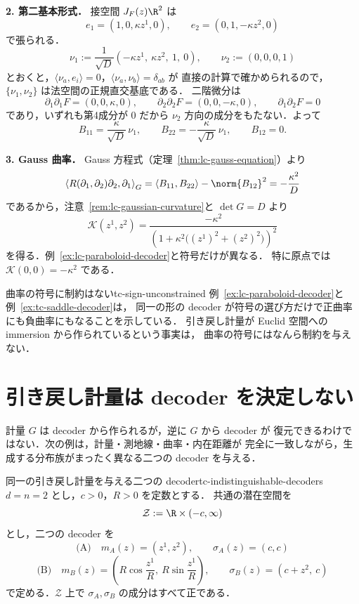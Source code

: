 \textbf{2. 第二基本形式．}
接空間 $J_F(z)\R^2$ は
\[
  e_1=(1,0,\kappa z^1,0),
  \qquad
  e_2=(0,1,-\kappa z^2,0)
\]
で張られる．
\[
  \nu_1:=\frac{1}{\sqrt{D}}\left(-\kappa z^1,\ \kappa z^2,\ 1,\ 0\right),
  \qquad
  \nu_2:=(0,0,0,1)
\]
とおくと，$\langle\nu_a,e_i\rangle=0$，$\langle\nu_a,\nu_b\rangle=\delta_{ab}$ が
直接の計算で確かめられるので，$\{\nu_1,\nu_2\}$ は法空間の正規直交基底である．
二階微分は
\[
  \partial_1\partial_1F=(0,0,\kappa,0),
  \qquad
  \partial_2\partial_2F=(0,0,-\kappa,0),
  \qquad
  \partial_1\partial_2F=0
\]
であり，いずれも第4成分が $0$ だから $\nu_2$ 方向の成分をもたない．よって
\[
  B_{11}=\frac{\kappa}{\sqrt D}\,\nu_1,
  \qquad
  B_{22}=-\frac{\kappa}{\sqrt D}\,\nu_1,
  \qquad
  B_{12}=0.
\]

\textbf{3. Gauss 曲率．}
Gauss 方程式（定理~\ref{thm:lc-gauss-equation}）より
\[
  \left\langle R(\partial_1,\partial_2)\partial_2,\partial_1\right\rangle_G
  =\langle B_{11},B_{22}\rangle-\norm{B_{12}}^2
  =-\frac{\kappa^2}{D}
\]
であるから，注意~\ref{rem:lc-gaussian-curvature}と $\det G=D$ より
\[
  \boxed{
    \mathcal{K}(z^1,z^2)
    =\frac{-\kappa^2}
      {\left(1+\kappa^2\bigl((z^1)^2+(z^2)^2\bigr)\right)^2}
  }
\]
を得る．例~\ref{ex:lc-paraboloid-decoder}と符号だけが異なる．
特に原点では $\mathcal{K}(0,0)=-\kappa^2$ である．

\begin{remark}{曲率の符号に制約はない}{tc-sign-unconstrained}
  例~\ref{ex:lc-paraboloid-decoder}と例~\ref{ex:tc-saddle-decoder}は，
  同一の形の decoder が符号の選び方だけで正曲率にも負曲率にもなることを示している．
  引き戻し計量が Euclid 空間への immersion から作られているという事実は，
  曲率の符号にはなんら制約を与えない．
\end{remark}

\section{引き戻し計量は decoder を決定しない}
\label{sec:tc-indistinguishable}

計量 $G$ は decoder から作られるが，逆に $G$ から decoder が
復元できるわけではない．次の例は，計量・測地線・曲率・内在距離が
完全に一致しながら，生成する分布族がまったく異なる二つの decoder を与える．

\begin{example}{同一の引き戻し計量を与える二つの decoder}{tc-indistinguishable-decoders}
  $d=n=2$ とし，$c>0$，$R>0$ を定数とする．
  共通の潜在空間を
  \[
    \mathcal{Z}:=\R\times(-c,\infty)
  \]
  とし，二つの decoder を
  \[
    \text{(A)}\quad
    m_A(z)=(z^1,z^2),
    \qquad
    \sigma_A(z)=(c,c)
  \]
  \[
    \text{(B)}\quad
    m_B(z)=\left(R\cos\frac{z^1}{R},\ R\sin\frac{z^1}{R}\right),
    \qquad
    \sigma_B(z)=(c+z^2,\ c)
  \]
  で定める．$\mathcal{Z}$ 上で $\sigma_A,\sigma_B$ の成分はすべて正である．
\end{example}

